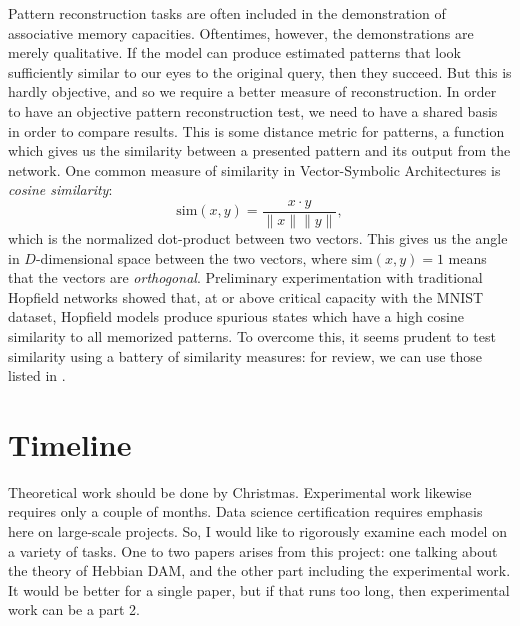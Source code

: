 \documentclass{article}
\theoremstyle{definition}
\begin{document}
Pattern reconstruction tasks are often included in the demonstration of
associative memory capacities. Oftentimes, however, the demonstrations
are merely qualitative. If the model can produce estimated patterns that
look sufficiently similar to our eyes to the original query, then they succeed.
But this is hardly objective, and so we require a better measure of
reconstruction.
In order to have an objective pattern reconstruction test, we need to
have a shared basis in order to compare results. This is some
distance metric for patterns, a function which gives us the similarity
between a presented pattern and its output from the network. One common
measure of similarity in Vector-Symbolic Architectures 
\parencites{smolensky_tensor_1990,plate_holographic_1995,gayler_multiplicative_1998}
is \textit{cosine similarity}:
\begin{equation}
  \text{sim}(x, y) = \frac{x \cdot y}{\|x \| \|y \|},
\end{equation}
which is the normalized dot-product between two vectors. This gives us the 
angle in $D$-dimensional space between the two vectors, where $\text{sim}(x, y) = 1$
means that the vectors are \textit{orthogonal}. Preliminary experimentation
with traditional Hopfield networks showed that, at or above critical capacity
with the MNIST dataset, Hopfield models produce spurious states which have
a high cosine similarity to all memorized patterns.
To overcome this, it seems prudent to test similarity using a battery of 
similarity measures: for review, we can use those listed in 
\textcite{kelly_memory_2017}. 


\section{Timeline}\label{sec:timeline}

Theoretical work should be done by Christmas. Experimental work likewise
requires only a couple of months. Data science certification requires emphasis
here on large-scale projects. So, I would like to rigorously examine
each model on a variety of tasks. One to two papers arises from this project:
one talking about the theory of Hebbian DAM, and the other part including
the experimental work. It would be better for a single paper, but if that
runs too long, then experimental work can be a part 2.

\printbibliography
\end{document}
